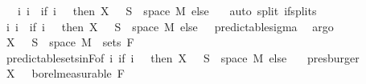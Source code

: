 \begin{isabellebody}
\ {\isachardoublequoteopen}{\isachardot}{\kern0pt}{\isachardot}{\kern0pt}{\isachardot}{\kern0pt}\ {\isacharequal}{\kern0pt}\ {\isacharparenleft}{\kern0pt}{\isasymUnion}i{\isachardot}{\kern0pt}\ {\isacharbraceleft}{\kern0pt}i{\isacharbraceright}{\kern0pt}\ {\isasymtimes}\ {\isacharparenleft}{\kern0pt}if\ i\ {\isacharequal}{\kern0pt}\ {}\ then\ X\ {}\ {\isacharminus}{\kern0pt}{\isacharbackquote}{\kern0pt}\ S\ {\isasyminter}\ space\ M\ else\ {\isacharbraceleft}{\kern0pt}{\isacharbraceright}{\kern0pt}{\isacharparenright}{\kern0pt}{\isacharparenright}{\kern0pt}{\isachardoublequoteclose}\ \isamarkupfalse%
\ {\isacharparenleft}{\kern0pt}auto\ split{\isacharcolon}{\kern0pt}\ if{\isacharunderscore}{\kern0pt}splits{\isacharparenright}{\kern0pt}\isanewline
\ \ \ \ \isamarkupfalse%
\ \isamarkupfalse%
\ {\isachardoublequoteopen}{\isacharparenleft}{\kern0pt}{\isasymUnion}i{\isachardot}{\kern0pt}\ {\isacharbraceleft}{\kern0pt}i{\isacharbraceright}{\kern0pt}\ {\isasymtimes}\ {\isacharparenleft}{\kern0pt}if\ i\ {\isacharequal}{\kern0pt}\ {}\ then\ X\ {}\ {\isacharminus}{\kern0pt}{\isacharbackquote}{\kern0pt}\ S\ {\isasyminter}\ space\ M\ else\ {\isacharbraceleft}{\kern0pt}{\isacharbraceright}{\kern0pt}{\isacharparenright}{\kern0pt}{\isacharparenright}{\kern0pt}\ {\isasymin}\ predictable{\isacharunderscore}{\kern0pt}sigma{\isachardoublequoteclose}\ \isamarkupfalse%
\ argo\isanewline
\ \ \ \ \isamarkupfalse%
\ \isamarkupfalse%
\ {\isachardoublequoteopen}X\ {}\ {\isacharminus}{\kern0pt}{\isacharbackquote}{\kern0pt}\ S\ {\isasyminter}\ space\ M\ {\isasymin}\ sets\ {\isacharparenleft}{\kern0pt}F\ {}{\isacharparenright}{\kern0pt}{\isachardoublequoteclose}\ \isamarkupfalse%
\ predictable{\isacharunderscore}{\kern0pt}sets{\isacharunderscore}{\kern0pt}in{\isacharunderscore}{\kern0pt}F{\isacharbrackleft}{\kern0pt}of\ {\isachardoublequoteopen}{\isasymlambda}i{\isachardot}{\kern0pt}\ if\ i\ {\isacharequal}{\kern0pt}\ {}\ then\ X\ {}\ {\isacharminus}{\kern0pt}{\isacharbackquote}{\kern0pt}\ S\ {\isasyminter}\ space\ M\ else\ {\isacharbraceleft}{\kern0pt}{\isacharbraceright}{\kern0pt}{\isachardoublequoteclose}{\isacharbrackright}{\kern0pt}\ \isamarkupfalse%
\ presburger\isanewline
\ \ \isacommand{{\isacharbraceright}{\kern0pt}}\isamarkupfalse%
\isanewline
\ \ \isamarkupfalse%
\ {\isachardoublequoteopen}X\ {}\ {\isasymin}\ borel{\isacharunderscore}{\kern0pt}measurable\ {\isacharparenleft}{\kern0pt}F\ {}{\isacharparenright}{\kern0pt}{\isachardoublequoteclose}\ \isamarkupfalse%

\end{isabellebody}
